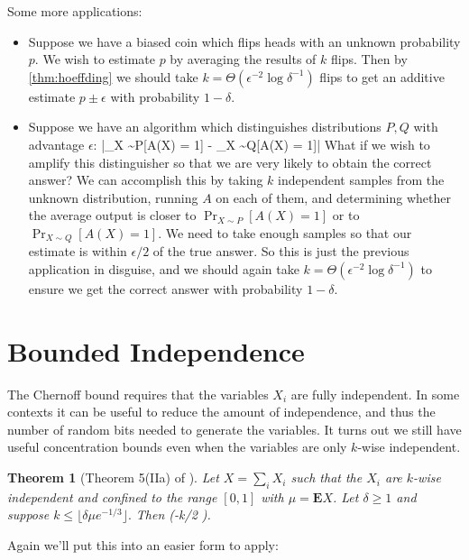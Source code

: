 \documentclass[11pt,a4paper]{article}
\newtheorem{theorem}{Theorem}
\newcommand*{\E}[0]{\mathbf{E}}
\def\[#1\]{\begin{align*}#1\end{align*}}
\begin{document}
Some more applications:

\begin{itemize}
\item
  Suppose we have a biased coin which flips heads with an unknown probability $p$.
  We wish to estimate $p$ by averaging the results of $k$ flips.
  Then by \cref{thm:hoeffding} we should take $k = \Theta(\epsilon^{-2} \log \delta^{-1})$ flips
  to get an additive estimate $p \pm \epsilon$ with probability $1 - \delta$.
\item
  Suppose we have an algorithm which distinguishes distributions $P, Q$ with advantage $\epsilon$:
  \[
  \left|\Pr_{X \sim P}[A(X) = 1] - \Pr_{X \sim Q}[A(X) = 1]\right| \ge \epsilon
  \]
  What if we wish to amplify this distinguisher so that we are very likely to obtain the correct answer?
  We can accomplish this by taking $k$ independent samples from the unknown distribution,
  running $A$ on each of them, and determining whether the average output is closer to $\Pr_{X \sim P}[A(X) = 1]$ or to $\Pr_{X \sim Q}[A(X) = 1]$.
  We need to take enough samples so that our estimate is within $\epsilon/2$ of the true answer.
  So this is just the previous application in disguise, and we should again take $k = \Theta(\epsilon^{-2} \log \delta^{-1})$
  to ensure we get the correct answer with probability $1 - \delta$.
\end{itemize}

\section{Bounded Independence}

The Chernoff bound requires that the variables \(X_i\) are fully independent.
In some contexts it can be useful to reduce the amount of independence, and thus the number of random bits needed to generate the variables.
It turns out we still have useful concentration bounds even when the variables are only \(k\)-wise independent.

\begin{theorem}[Theorem 5(IIa) of \cite{limited-chernoff}]
  \label{thm:limited-chernoff}
  Let \(X = \sum_i X_i\) such that the \(X_i\) are \(k\)-wise independent and confined to the range \([0, 1]\) with \(\mu = \E X\).
  Let \(\delta \ge 1\) and suppose \(k \le \lfloor \delta \mu e^{-1/3} \rfloor.\)
  Then \[\Pr[X \ge (1 + \delta)\mu] \le \exp(-\lfloor k/2 \rfloor).\]
\end{theorem}

Again we'll put this into an easier form to apply:
\end{document}
